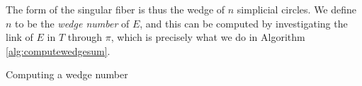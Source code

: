 The form of the singular fiber is thus the wedge of $n$ simplicial circles.
We define $n$ to be the \emph{wedge number} of $E$, and this can be computed by investigating the link of $E$ in $T$ through $\pi$, which is precisely what we do in Algorithm \ref{alg:computewedgesum}.

\begin{algorithm}[h]
	\caption{Computing a wedge number}
	\label{alg:computewedgesum}
\end{algorithm}

